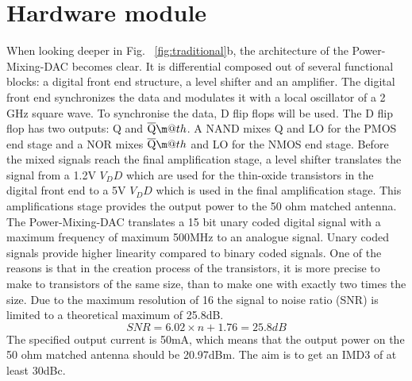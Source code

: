\makeatletter
\newcommand*{\textoverline}[1]{$\overline{\hbox{#1}}\m@th$}
\makeatother

\section{Hardware module}\label{sec:overview}
When looking deeper in Fig. ~\ref{fig:traditional}b, the architecture of the Power-Mixing-DAC becomes clear. It is differential composed out of several functional blocks: a digital front end structure, a level shifter and an amplifier. 
The digital front end synchronizes the data and modulates it with a local oscillator of a 2 GHz square wave. To synchronise the data, D flip flops will be used. The D flip flop has two outputs: Q and \textoverline{Q}. A NAND mixes Q and LO for the PMOS end stage and a NOR mixes \textoverline{Q} and LO for the NMOS end stage. Before the mixed signals reach the final amplification stage, a level shifter translates the signal from a 1.2V $V_DD$ which are used for the thin-oxide transistors in the digital front end to a 5V $V_DD$ which is used in the final amplification stage. This amplifications stage provides the output power to the 50 ohm matched antenna.
The Power-Mixing-DAC translates a 15 bit unary coded digital signal with a maximum frequency of maximum 500MHz to an analogue signal. Unary coded signals provide higher linearity compared to binary coded signals. One of the reasons is that in the creation process of the transistors, it is more precise to make to transistors of the same size, than to make one with exactly two times the size. Due to the maximum resolution of 16 the signal to noise ratio (SNR) is limited to a theoretical maximum of 25.8dB.
\begin{equation}\label{eq:SNR}{SNR = 6.02 \times n + 1.76 = 25.8 dB}\end{equation}
The specified output current is 50mA, which means that the output power on the 50 ohm matched antenna should be 20.97dBm. The aim is to get an IMD3 of at least 30dBc.
